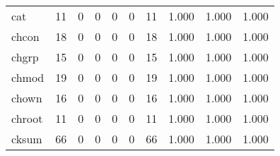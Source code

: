\begin{longtable}{lp{1.3cm}p{1.3cm}p{1.3cm}p{1.3cm}p{1.3cm}p{1.3cm}p{1.3cm}p{1.3cm}p{1.3cm}}
cat       &                     11 &                                             0 &                                            0 &                                           0 &                                            0 &                                         11 &                                1.000 &                                  1.000 &                                1.000 \\
chcon     &                     18 &                                             0 &                                            0 &                                           0 &                                            0 &                                         18 &                                1.000 &                                  1.000 &                                1.000 \\
chgrp     &                     15 &                                             0 &                                            0 &                                           0 &                                            0 &                                         15 &                                1.000 &                                  1.000 &                                1.000 \\
chmod     &                     19 &                                             0 &                                            0 &                                           0 &                                            0 &                                         19 &                                1.000 &                                  1.000 &                                1.000 \\
chown     &                     16 &                                             0 &                                            0 &                                           0 &                                            0 &                                         16 &                                1.000 &                                  1.000 &                                1.000 \\
chroot    &                     11 &                                             0 &                                            0 &                                           0 &                                            0 &                                         11 &                                1.000 &                                  1.000 &                                1.000 \\
cksum     &                     66 &                                             0 &                                            0 &                                           0 &                                            0 &                                         66 &                                1.000 &                                  1.000 &                                1.000 \\

\end{longtable}
